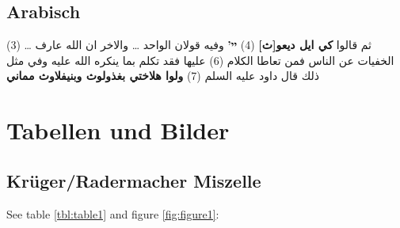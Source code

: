 \documentclass[
  english,
  a4paper,
  DIV=12,
  footlines=2.1,
  usegeometry=true]{scrartcl}
\begin{document}
\hypertarget{arabisch}{%
\subsection{Arabisch}\label{arabisch}}

\begin{Arabic}

\leavevmode\marginpar{\textcolor{parnum}{{[}33{]}}}(3) \ldots{} ثم قالوا
\textbf{كي ايل ديعو{[}ث{]}} (4) \textbf{יי'} وفيه قولان الواحد \ldots{}
والاخر ان الله عارف الخفيات عن الناس فمن تعاطا الكلام (6) عليها فقد تكلم
بما ينكره الله عليه وفي مثل ذلك قال داود عليه السلم (7) \textbf{ولوا
هلاختي بغذولوث وبنيفلاوث مماني}

\end{Arabic}

\hypertarget{tabellen-und-bilder}{%
\section{Tabellen und Bilder}\label{tabellen-und-bilder}}

\hypertarget{kruxfcgerradermacher-miszelle}{%
\subsection{Krüger/Radermacher
Miszelle}\label{kruxfcgerradermacher-miszelle}}

\leavevmode\marginpar{\textcolor{parnum}{{[}34{]}}}See table
\ref{tbl:table1} and figure \ref{fig:figure1}:
\end{document}
